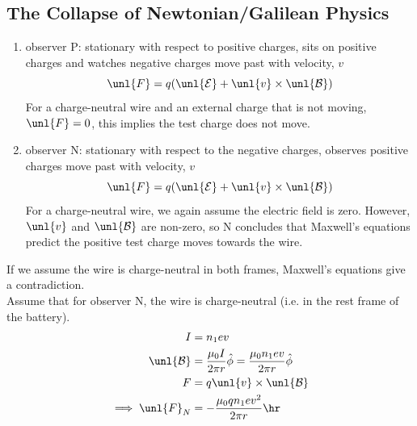\documentclass[a4paper, 11pt, normalem]{report}
\renewcommand\E{\mathcal{E}}
\newcommand\uE{\unl{\E}}
\renewcommand\B{\mathcal{B}}
\newcommand\uB{\unl{\B}}
\begin{document}
\subsection{The Collapse of Newtonian/Galilean Physics}
\begin{enumerate}
    \item observer P: stationary with respect to positive charges, sits on positive charges and watches negative charges move past with velocity, $v$
    \begin{equation}
        \unl{F} = q(\uE + \unl{v}\times\uB)
    \end{equation}
    For a charge-neutral wire and an external charge that is not moving, $\unl{F} = 0$, this implies the test charge does not move.
    \item observer N: stationary with respect to the negative charges, observes positive charges move past with velocity, $v$
    \begin{equation}
        \unl{F} = q(\uE + \unl{v}\times\uB)
    \end{equation}
    For a charge-neutral wire, we again assume the electric field is zero.
    However, $\unl{v}$ and $\uB$ are non-zero, so N concludes that Maxwell's equations predict the positive test charge moves towards the wire.
\end{enumerate}
If we assume the wire is charge-neutral in both frames, Maxwell's equations give a contradiction. \\
Assume that for observer N, the wire is charge-neutral (i.e. in the rest frame of the battery).
\begin{align}
    I &= n_1ev \\
    \uB &= \frac{\mu_0I}{2\pi r}\hat{\phi} = \frac{\mu_0 n_1ev}{2\pi r}\hat{\phi} \\
    F &= q\unl{v}\times\uB \\
    \implies \unl{F}_N &= -\frac{\mu_0 qn_1ev^2}{2\pi r}\hr
\end{align}
\end{document}
